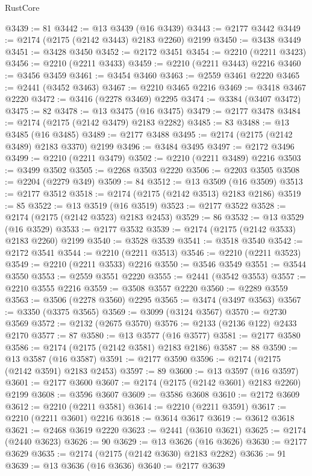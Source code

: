 \begin{lexlean}{RustCore}
\begin{coremodule}
@3439 := 81
@3442 := @13 @3439 (@16 @3439)
@3443 := @2177 @3442
@3449 := @2174 (@2175 (@2142 @3443) @2183 @2260) @2199
@3450 := @3438 @3449
@3451 := @3428 @3450
@3452 := @2172 @3451
@3454 := @2210 (@2211 @3423)
@3456 := @2210 (@2211 @3433)
@3459 := @2210 (@2211 @3443) @2216
@3460 := @3456 @3459
@3461 := @3454 @3460
@3463 := @2559 @3461 @2220
@3465 := @2441 (@3452 @3463)
@3467 := @2210 @3465 @2216
@3469 := @3418 @3467 @2220
@3472 := @3416 (@2278 @3469) @2295
@3474 := @3384 (@3407 @3472)
@3475 := 82
@3478 := @13 @3475 (@16 @3475)
@3479 := @2177 @3478
@3484 := @2174 (@2175 (@2142 @3479) @2183 @2282)
@3485 := 83
@3488 := @13 @3485 (@16 @3485)
@3489 := @2177 @3488
@3495 := @2174 (@2175 (@2142 @3489) @2183 @3370) @2199
@3496 := @3484 @3495
@3497 := @2172 @3496
@3499 := @2210 (@2211 @3479)
@3502 := @2210 (@2211 @3489) @2216
@3503 := @3499 @3502
@3505 := @2268 @3503 @2220
@3506 := @2203 @3505
@3508 := @2204 (@2279 @349)
@3509 := 84
@3512 := @13 @3509 (@16 @3509)
@3513 := @2177 @3512
@3518 := @2174 (@2175 (@2142 @3513) @2183 @2186)
@3519 := 85
@3522 := @13 @3519 (@16 @3519)
@3523 := @2177 @3522
@3528 := @2174 (@2175 (@2142 @3523) @2183 @2453)
@3529 := 86
@3532 := @13 @3529 (@16 @3529)
@3533 := @2177 @3532
@3539 := @2174 (@2175 (@2142 @3533) @2183 @2260) @2199
@3540 := @3528 @3539
@3541 := @3518 @3540
@3542 := @2172 @3541
@3544 := @2210 (@2211 @3513)
@3546 := @2210 (@2211 @3523)
@3549 := @2210 (@2211 @3533) @2216
@3550 := @3546 @3549
@3551 := @3544 @3550
@3553 := @2559 @3551 @2220
@3555 := @2441 (@3542 @3553)
@3557 := @2210 @3555 @2216
@3559 := @3508 @3557 @2220
@3560 := @2289 @3559
@3563 := @3506 (@2278 @3560) @2295
@3565 := @3474 (@3497 @3563)
@3567 := @3350 (@3375 @3565)
@3569 := @3099 (@3124 @3567)
@3570 := @2730 @3569
@3572 := @2132 (@2675 @3570)
@3576 := @2133 (@2136 @122) @2433 @2170
@3577 := 87
@3580 := @13 @3577 (@16 @3577)
@3581 := @2177 @3580
@3586 := @2174 (@2175 (@2142 @3581) @2183 @2186)
@3587 := 88
@3590 := @13 @3587 (@16 @3587)
@3591 := @2177 @3590
@3596 := @2174 (@2175 (@2142 @3591) @2183 @2453)
@3597 := 89
@3600 := @13 @3597 (@16 @3597)
@3601 := @2177 @3600
@3607 := @2174 (@2175 (@2142 @3601) @2183 @2260) @2199
@3608 := @3596 @3607
@3609 := @3586 @3608
@3610 := @2172 @3609
@3612 := @2210 (@2211 @3581)
@3614 := @2210 (@2211 @3591)
@3617 := @2210 (@2211 @3601) @2216
@3618 := @3614 @3617
@3619 := @3612 @3618
@3621 := @2468 @3619 @2220
@3623 := @2441 (@3610 @3621)
@3625 := @2174 (@2440 @3623)
@3626 := 90
@3629 := @13 @3626 (@16 @3626)
@3630 := @2177 @3629
@3635 := @2174 (@2175 (@2142 @3630) @2183 @2282)
@3636 := 91
@3639 := @13 @3636 (@16 @3636)
@3640 := @2177 @3639

\end{coremodule}
\end{lexlean}
